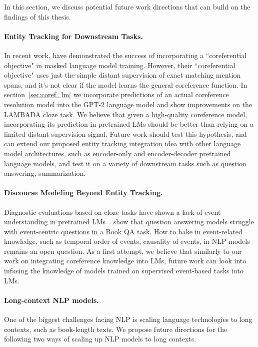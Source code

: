 \documentclass[12pt]{thesis-umich}[thesis]
\begin{document}
In this section, we discuss potential future work directions that can build on the findings of this thesis.


\paragraph{Entity Tracking for Downstream Tasks.} 
In recent work, \citet{ye-etal-2020-coreferential} have demonstrated the success of incorporating a ``coreferential objective"  in masked language model training.
However, their ``coreferential objective" uses just the simple distant supervision of exact matching mention spans, and it's not clear if the model learns the general coreference function. 
In section~\ref{sec:coref_lm} we incorporate predictions of an actual coreference resolution model into the GPT-2 language model and show improvements on the LAMBADA cloze task. 
We believe that given a high-quality coreference model, incorporating its prediction in pretrained LMs should be better than relying on a limited distant supervision signal. 
Future work should test this hypothesis, and 
 can extend our proposed entity tracking integration idea with other language model architectures, such as encoder-only and encoder-decoder pretrained language models, and test it on a variety of downstream tasks such as question answering, summarization.  







\paragraph{Discourse Modeling Beyond Entity Tracking.} 
Diagnostic evaluations based on cloze tasks have shown a lack of event understanding in pretrained LMs~\cite{ettinger-2020-bert, lialin-etal-2022-life}. 
\citet{mou-etal-2021-narrative} show that question answering models struggle with event-centric questions in a  Book QA task. 
How to bake in event-related knowledge, such as temporal order of events, causality of events, in NLP models remains an open question. 
As a first attempt, we believe that similarly to our work on integrating coreference knowledge into LMs, future work can look into infusing the knowledge of models trained on supervised event-based tasks into LMs. 







\paragraph{Long-context NLP models.} 
One of the biggest challenges facing NLP is scaling language technologies to long contexts, such as book-length texts. We propose future directions for the following two ways of scaling up NLP models to long contexts. 
\end{document}
